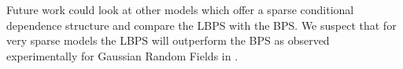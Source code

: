 Future work could look at other models which offer a sparse conditional dependence structure and compare the LBPS with the BPS. We suspect that for very sparse models the LBPS will outperform the BPS as observed experimentally for Gaussian Random Fields in \citep{bouchard15}. %




